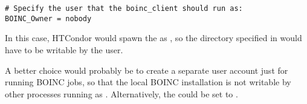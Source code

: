 \footnotesize
\begin{verbatim}
# Specify the user that the boinc_client should run as:
BOINC_Owner = nobody
\end{verbatim}
\normalsize

In this case, HTCondor would spawn the  as
, so the directory specified in 
would have to be writable by the  user.

A better choice would probably be to create a separate user account
just for running BOINC jobs, so that the local BOINC installation is
not writable by other processes running as .
Alternatively, the  could be set to
. 

\noindent {}

